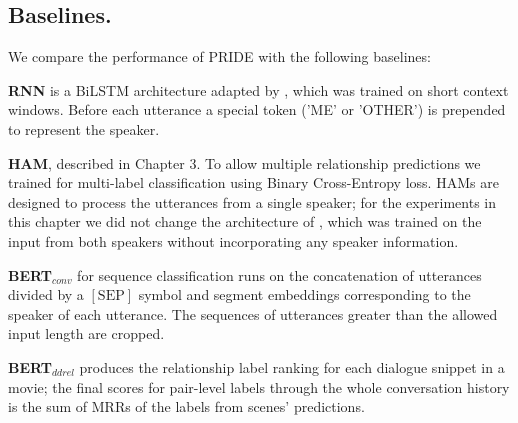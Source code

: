 \subsection{Baselines.}
 We compare the performance of PRIDE with the following baselines:
 \squishlist
     \item \textbf{RNN} is a BiLSTM \cite{graves2005framewise} architecture adapted by \citet{welch2019look}, which was trained on short context windows. Before each utterance a special token ('\textlangle ME\textrangle' or '\textlangle OTHER\textrangle') is prepended to represent the speaker.
     \item \textbf{HAM}, described in Chapter 3. To allow multiple relationship predictions we trained  for multi-label classification using Binary Cross-Entropy loss. HAMs are designed to process the utterances from a single speaker; for the experiments in this chapter we did not change the architecture of , which was trained on the input from both speakers without incorporating any speaker information.
     \item \textbf{BERT$_{conv}$} for sequence classification \cite{lu2020improving} runs on the concatenation of utterances divided by a $[\textrm{SEP}]$ symbol and segment embeddings corresponding to the speaker of each utterance. The sequences of utterances greater than the allowed input length are cropped.
     \item \textbf{BERT$_{ddrel}$} 
     \cite{jia2020ddrel} 
     produces the relationship label ranking for each dialogue snippet in a movie; the final scores for pair-level labels through the whole conversation history is the sum of MRRs of the labels from scenes' predictions.
 \squishend